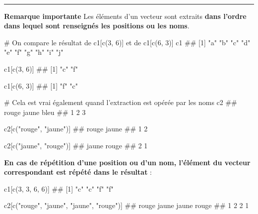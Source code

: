 \documentclass[12pt,twosided, notitlepage]{book}
\newenvironment{Shaded}{}{}
\newcommand{\KeywordTok}[1]{\textcolor[rgb]{0.00,0.00,1.00}{#1}}
\newcommand{\DecValTok}[1]{#1}
\newcommand{\StringTok}[1]{\textcolor[rgb]{0.00,0.50,0.50}{#1}}
\newcommand{\CommentTok}[1]{\textcolor[rgb]{0.00,0.50,0.00}{#1}}
\newcommand{\NormalTok}[1]{#1}
\renewenvironment{Shaded}{\begin{snugshade}}{\end{snugshade}}
\begin{document}
~

\begin{center}\rule{0.5\linewidth}{\linethickness}\end{center}

\textbf{Remarque importante} Les éléments d'un vecteur sont extraits
\textbf{dans l'ordre dans lequel sont renseignés les positions ou les
noms}.

\begin{Shaded}
\begin{Highlighting}[]
\CommentTok{# On compare le résultat de c1[c(3, 6)] et de c1[c(6, 3)]}
\NormalTok{c1}
\NormalTok{  ##  [1] "a" "b" "c" "d" "e" "f" "g" "h" "i" "j"}

\NormalTok{c1[}\KeywordTok{c}\NormalTok{(}\DecValTok{3}\NormalTok{, }\DecValTok{6}\NormalTok{)]}
\NormalTok{  ## [1] "c" "f"}

\NormalTok{c1[}\KeywordTok{c}\NormalTok{(}\DecValTok{6}\NormalTok{, }\DecValTok{3}\NormalTok{)]}
\NormalTok{  ## [1] "f" "c"}

\CommentTok{# Cela est vrai également quand l'extraction est opérée par les noms}
\NormalTok{c2}
\NormalTok{  ## rouge jaune  bleu }
\NormalTok{  ##     1     2     3}

\NormalTok{c2[}\KeywordTok{c}\NormalTok{(}\StringTok{"rouge"}\NormalTok{, }\StringTok{"jaune"}\NormalTok{)]}
\NormalTok{  ## rouge jaune }
\NormalTok{  ##     1     2}

\NormalTok{c2[}\KeywordTok{c}\NormalTok{(}\StringTok{"jaune"}\NormalTok{, }\StringTok{"rouge"}\NormalTok{)]}
\NormalTok{  ## jaune rouge }
\NormalTok{  ##     2     1}
\end{Highlighting}
\end{Shaded}

\textbf{En cas de répétition d'une position ou d'un nom, l'élément du
vecteur correspondant est répété dans le résultat} :

\begin{Shaded}
\begin{Highlighting}[]
\NormalTok{c1[}\KeywordTok{c}\NormalTok{(}\DecValTok{3}\NormalTok{, }\DecValTok{3}\NormalTok{, }\DecValTok{6}\NormalTok{, }\DecValTok{6}\NormalTok{)]}
\NormalTok{  ## [1] "c" "c" "f" "f"}

\NormalTok{c2[}\KeywordTok{c}\NormalTok{(}\StringTok{"rouge"}\NormalTok{, }\StringTok{"jaune"}\NormalTok{, }\StringTok{"jaune"}\NormalTok{, }\StringTok{"rouge"}\NormalTok{)]}
\NormalTok{  ## rouge jaune jaune rouge }
\NormalTok{  ##     1     2     2     1}
\end{Highlighting}
\end{Shaded}
\end{document}
